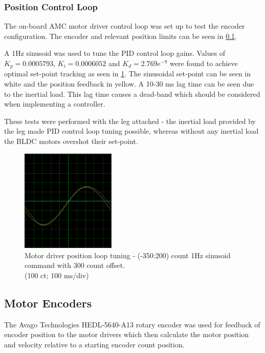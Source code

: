 \subsubsection{Position Control Loop}
The on-board AMC motor driver control loop was set up to test the encoder configuration. The encoder and relevant position limits can be seen in \cref{sec:motor-encoders}. 

A 1Hz sinusoid was used to tune the PID control loop gains. Values of $K_p = 0.0005793$, $K_i = 0.0006052$ and $K_d = 2.769e^{-9}$ were found to achieve optimal set-point tracking as seen in \cref{fig:position-tuning-plots}. The sinusoidal set-point can be seen in white and the position feedback in yellow. A 10-30 ms lag time can be seen due to the inertial load. This lag time causes a dead-band which should be considered when implementing a controller. 

These tests were performed with the leg attached - the inertial load provided by the leg made PID control loop tuning possible, whereas without any inertial load the BLDC motors overshot their set-point.

\begin{figure}
\centering
\includegraphics[width=0.4\textwidth]{images/driveware/position-tuning-plot} 
\caption{Motor driver position loop tuning - (-350:200) count 1Hz sinusoid command with 300 count offset.\\(100 ct; 100 ms/div)}
\label{fig:position-tuning-plots}
\end{figure}

\subsection{Motor Encoders}
\label{sec:motor-encoders}

The Avago Technologies HEDL-5640-A13 rotary encoder was used for feedback of encoder position to the motor drivers which then calculate the motor position and velocity relative to a starting encoder count position. 

